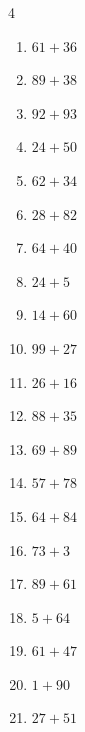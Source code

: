 \begin{multicols}{4}
\begin{enumerate}
  \item $61+36$
        \phantom{$=97$}

  \item $89+38$
        \phantom{$=127$}

  \item $92+93$
        \phantom{$=185$}

  \item $24+50$
        \phantom{$=74$}

  \item $62+34$
        \phantom{$=96$}

  \item $28+82$
        \phantom{$=110$}

  \item $64+40$
        \phantom{$=104$}

  \item $24+5$
        \phantom{$=29$}

  \item $14+60$
        \phantom{$=74$}

  \item $99+27$
        \phantom{$=126$}

  \item $26+16$
        \phantom{$=42$}

  \item $88+35$
        \phantom{$=123$}

  \item $69+89$
        \phantom{$=158$}

  \item $57+78$
        \phantom{$=135$}

  \item $64+84$
        \phantom{$=148$}

  \item $73+3$
        \phantom{$=76$}

  \item $89+61$
        \phantom{$=150$}

  \item $5+64$
        \phantom{$=69$}

  \item $61+47$
        \phantom{$=108$}

  \item $1+90$
        \phantom{$=91$}

  \item $27+51$
        \phantom{$=78$}

\columnbreak %


\end{enumerate}
\end{multicols}
